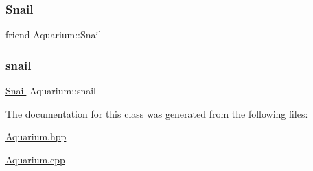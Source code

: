 \subsubsection{\texorpdfstring{Snail}{Snail}}
{\footnotesize\ttfamily friend Aquarium\+::\+Snail\hspace{0.3cm}{\ttfamily [private]}}

\mbox{\label{class_aquarium_a031f639386ae1f30bda7d97f75781b17}} 
\subsubsection{\texorpdfstring{snail}{snail}}
{\footnotesize\ttfamily \mbox{\hyperlink{class_snail}{Snail}} Aquarium\+::snail}



The documentation for this class was generated from the following files\+:\begin{DoxyCompactItemize}
\item 
\mbox{\hyperlink{_aquarium_8hpp}{Aquarium.\+hpp}}\item 
\mbox{\hyperlink{_aquarium_8cpp}{Aquarium.\+cpp}}\end{DoxyCompactItemize}
